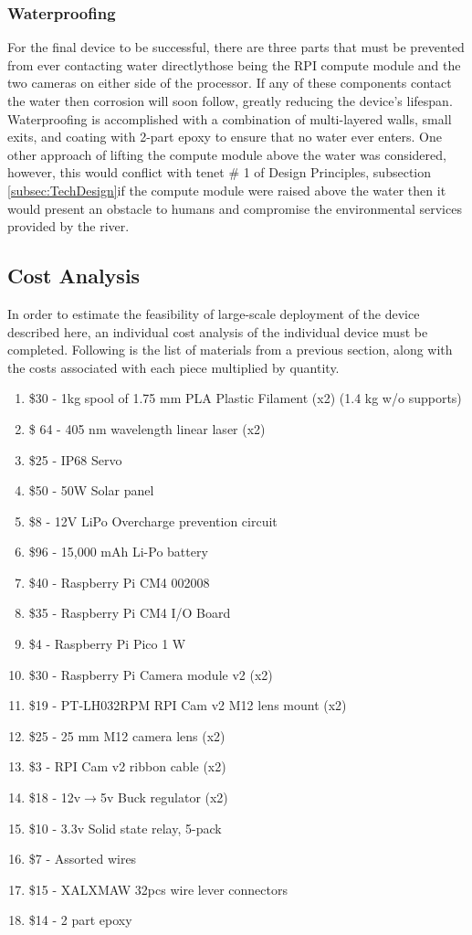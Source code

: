 \documentclass[fleqn,10pt]{SelfArx} %
\begin{document}
	\subsubsection{Waterproofing}
	For the final device to be successful, there are three parts that must be prevented from ever contacting water directly\textemdash those being the \gls{RPI} compute module and the two cameras on either side of the processor. If any of these components contact the water then corrosion will soon follow, greatly reducing the device’s lifespan. Waterproofing is accomplished with a combination of multi-layered walls, small exits, and coating with 2-part epoxy to ensure that no water ever enters. One other approach of lifting the compute module above the water was considered, however, this would conflict with tenet \# 1 of Design Principles, subsection \ref{subsec:TechDesign}\textemdash if the compute module were raised above the water then it would present an obstacle to humans and compromise the environmental services provided by the river. 
	\subsection{Cost Analysis}
	\label{CostAnalysis}
	In order to estimate the feasibility of large-scale deployment of the device described here, an individual cost analysis of the individual device must be completed. Following is the list of materials from a previous section, along with the costs associated with each piece multiplied by quantity.
	
	\begin{enumerate}
		
		\item \$30 - 1kg spool of 1.75 mm PLA Plastic Filament (x2) (1.4 kg w/o supports)
		\item \$ 64 - 405 nm wavelength linear laser (x2)
		\item \$25 - IP68 Servo
		\item \$50 - 50W Solar panel
		\item \$8 - 12V LiPo Overcharge prevention circuit
		\item \$96 - 15,000 mAh Li-Po battery
		\item \$40 - Raspberry Pi CM4 002008
		\item \$35 - Raspberry Pi CM4 I/O Board
		\item \$4 - Raspberry Pi Pico 1 W
		\item \$30 - Raspberry Pi Camera module v2 (x2)
		\item \$19 - PT-LH032RPM \gls{RPI} Cam v2 M12 lens mount (x2)
		\item \$25 - 25 mm M12 camera lens (x2)
		\item \$3 - \gls{RPI} Cam v2 ribbon cable (x2)
		\item \$18 - 12v$\rightarrow$5v Buck regulator (x2)
		\item \$10 - 3.3v Solid state relay, 5-pack
		\item \$7 - Assorted wires
		\item \$15 - XALXMAW 32pcs wire lever connectors
		\item \$14 - 2 part epoxy 
	\end{enumerate}
	
\end{document}
